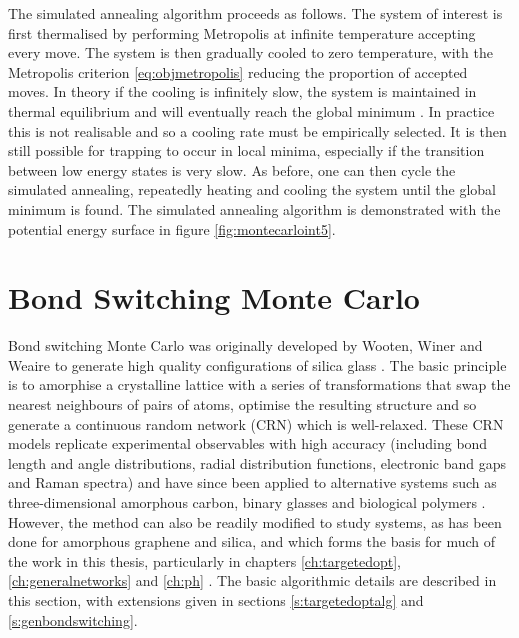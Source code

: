 The simulated annealing algorithm proceeds as follows.
The system of interest is first thermalised by performing Metropolis \mc{} at infinite temperature \ie{} accepting every move. 
The system is then gradually cooled to zero temperature, with the Metropolis criterion \eqref{eq:objmetropolis} reducing the proportion of accepted moves.
In theory if the cooling is infinitely slow, the system is maintained in thermal equilibrium and will eventually reach the global minimum \cite{Henderson2003}.
In practice this is not realisable and so a cooling rate must be empirically selected.
It is then still possible for trapping to occur in local minima, especially if the transition between low energy states is very slow.
As before, one can then cycle the simulated annealing, repeatedly heating and cooling the system until the global minimum is found.
The simulated annealing algorithm is demonstrated with the \td{} potential energy surface in figure \ref{fig:montecarloint5}.

\section{Bond Switching Monte Carlo}
\label{s:bondswitch}

Bond switching Monte Carlo was originally developed by Wooten, Winer and Weaire to generate high quality configurations of \thd{} silica glass \cite{Wooten1985}.
The basic principle is to amorphise a crystalline lattice with a series of transformations that swap the nearest neighbours of pairs of atoms, optimise the resulting structure and so generate a continuous random network (CRN) which is well\--relaxed.
These CRN models replicate experimental observables with high accuracy (including bond length and angle distributions, radial distribution functions, electronic band gaps and Raman spectra) and have since been applied to alternative systems such as three\--dimensional amorphous carbon, binary glasses and biological polymers \cite{Treacy2012,Tu1998,Djordjevic1995,Mousseau2004,Huisman2008,Broedersz2014}.
However, the method can also be readily modified to study \td{} systems, as has been done for amorphous graphene and silica, and which forms the basis for much of the work in this thesis, particularly in chapters \ref{ch:targetedopt}, \ref{ch:generalnetworks} and \ref{ch:ph} \cite{Kumar2014,Jain2018}.
The basic algorithmic details are described in this section, with extensions given in sections \ref{s:targetedoptalg} and \ref{s:genbondswitching}.

